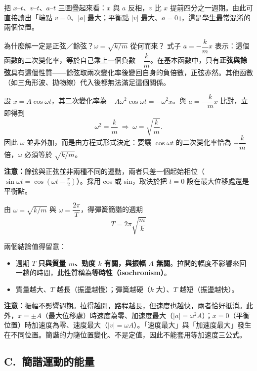 \documentclass[11pt]{article}
\begin{document}

把 $x$–$t$、$v$–$t$、$a$–$t$ 三圖疊起來看：$x$ 與 $a$ 反相，$v$ 比 $x$ 提前四分之一週期。由此可直接讀出「端點 $v=0$、$|a|$ 最大；平衡點 $|v|$ 最大、$a=0$」，這是學生最常混淆的兩個位置。

\begin{補充框}{為什麼解一定是正弦／餘弦？$\omega=\sqrt{k/m}$ 從何而來？}
式子 $a=-\dfrac{k}{m}x$ 表示：這個函數的二次變化率，等於自己乘上一個負數 $-\dfrac{k}{m}$。在基本函數中，只有\textbf{正弦與餘弦}具有這個性質——餘弦取兩次變化率後變回自身的負倍數，正弦亦然。其他函數（如三角形波、拋物線）代入後都無法滿足這個關係。

設 $x=A\cos\omega t$，其二次變化率為 $-A\omega^2\cos\omega t=-\omega^2 x$。與 $a=-\dfrac{k}{m}x$ 比對，立即得到
$$\omega^2=\frac{k}{m}\;\Rightarrow\;\omega=\sqrt{\frac{k}{m}}.$$
因此 $\omega$ 並非外加，而是由方程式形式決定：要讓 $\cos\omega t$ 的二次變化率恰為 $-\dfrac{k}{m}$ 倍，$\omega$ 必須等於 $\sqrt{k/m}$。

\textbf{注意：}餘弦與正弦並非兩種不同的運動，兩者只差一個起始相位（$\sin\omega t=\cos(\omega t-\tfrac{\pi}{2})$）。採用 cos 或 sin，取決於把 $t=0$ 設在最大位移處還是平衡點。
\end{補充框}

由 $\omega=\sqrt{k/m}$ 與 $\omega=\dfrac{2\pi}{T}$，得彈簧簡諧的週期
$$\boxed{\;T=2\pi\sqrt{\frac{m}{k}}\;}$$

兩個結論值得留意：
\begin{itemize}\setlength{\itemsep}{1pt}
\item 週期 $T$ \textbf{只與質量 $m$、勁度 $k$ 有關，與振幅 $A$ 無關}。拉開的幅度不影響來回一趟的時間，此性質稱為\textbf{等時性（isochronism）}。
\item 質量越大、$T$ 越長（振盪越慢）；彈簧越硬（$k$ 大）、$T$ 越短（振盪越快）。
\end{itemize}

\textbf{注意：}振幅不影響週期。拉得越開，路程越長，但速度也越快，兩者恰好抵消。此外，$x=\pm A$（最大位移處）時速度為零、加速度最大（$|a|=\omega^2 A$）；$x=0$（平衡位置）時加速度為零、速度最大（$|v|=\omega A$）。「速度最大」與「加速度最大」發生在不同位置。簡諧的力隨位置變化、不是定值，因此不能套用等加速度三公式。

\subsection*{\sffamily C.\ 簡諧運動的能量}
\end{document}
